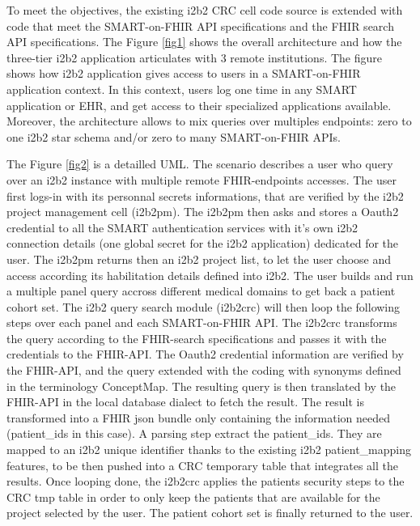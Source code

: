 \documentclass{amia}
\begin{document}
To meet the objectives, the existing i2b2 CRC cell code source is extended with code that meet the SMART-on-FHIR API specifications and the FHIR search API specifications. The Figure \ref{fig1} shows the overall architecture and how the three-tier i2b2 application articulates with 3 remote institutions. The figure shows how i2b2 application gives access to users in a SMART-on-FHIR application context. In this context, users log one time in any SMART application or EHR, and get access to their specialized applications available. Moreover, the architecture allows to mix queries over multiples endpoints: zero to one i2b2 star schema and/or zero to many SMART-on-FHIR APIs.


The Figure \ref{fig2} is a detailled UML. The scenario describes a user who query over an i2b2 instance with multiple remote FHIR-endpoints accesses. 
The user first logs-in with its personnal secrets informations, that are verified by the i2b2 project management cell (i2b2pm). The i2b2pm then asks and stores a Oauth2 credential to all the SMART authentication services with it's own i2b2 connection details (one global secret for the i2b2 application) dedicated for the user. The i2b2pm returns then an i2b2 project list, to let the user choose and access according its habilitation details defined into i2b2. The user builds and run a multiple panel query accross different medical domains to get back a patient cohort set. The i2b2 query search module (i2b2crc) will then loop the following steps over each panel and each SMART-on-FHIR API. The i2b2crc transforms the query according to the FHIR-search specifications  and passes it with the credentials to the FHIR-API. The Oauth2 credential information are verified by the FHIR-API, and the query extended with the coding with synonyms defined in the terminology ConceptMap. The resulting query is then translated by the FHIR-API in the local database dialect to fetch the result. The result is transformed into a FHIR json bundle only containing the information needed (patient\_ids in this case). A parsing step extract the patient\_ids. They are mapped to an i2b2 unique identifier thanks to the existing i2b2 patient\_mapping features, to be then pushed into a CRC temporary table that integrates all the results. Once looping done, the i2b2crc applies the patients security steps to the CRC tmp table in order to only keep the patients that are available for the project selected by the user. The patient cohort set is finally returned to the user.
\end{document}
